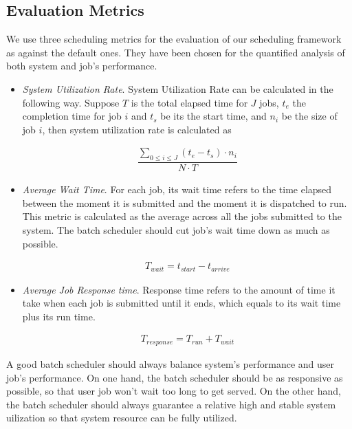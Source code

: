 \documentclass[conference]{IEEEtran}
\begin{document}
\subsection{Evaluation Metrics} 
\label{sec:metrics}
We use three scheduling metrics for the evaluation of our scheduling framework as against the default ones. They have been chosen for the quantified analysis of both system and job's performance.

\begin{itemize}
  
  \item \emph{System Utilization Rate}.  System Utilization Rate can be calculated in the following way. Suppose $T$ is the total elapsed time for $J$ jobs, $t_e$  the completion time for job $i$ and $t_s$ be its the start time, and $n_i$ be the size of job $i$, then system utilization rate is calculated as
  
  \begin{eqnarray}\displaystyle
  \dfrac{\sum_{0\leq i\leq J}{(t_e-t_s) \cdot n_i}}{N \cdot T}
  \end{eqnarray} 
  
  \item \emph{Average Wait Time}. For each job, its wait time refers to the time elapsed between the moment it is submitted and the moment it is dispatched to run. This metric is calculated as the average across all the jobs submitted to the system. The batch scheduler should cut job's wait time down as much as possible.
  
   \begin{eqnarray}\displaystyle
    T_{wait} = t_{start}-t_{arrive}
  \end{eqnarray} 
  
  
	\item \emph{Average Job Response time}. Response time refers to the amount of time it take when each job is submitted until it ends, which equals to its wait time plus its run time.
       
  \begin{eqnarray}\displaystyle
    T_{response} = T_{run}+T_{wait}
  \end{eqnarray}   
	
\end{itemize}

A good batch scheduler should always balance system's performance and user job's performance. On one hand, the batch scheduler should be as responsive as possible, so that user job won't wait too long to get served. On the other hand, the batch scheduler should always guarantee a relative high and stable system uilization so that system resource can be fully utilized.
\end{document}
